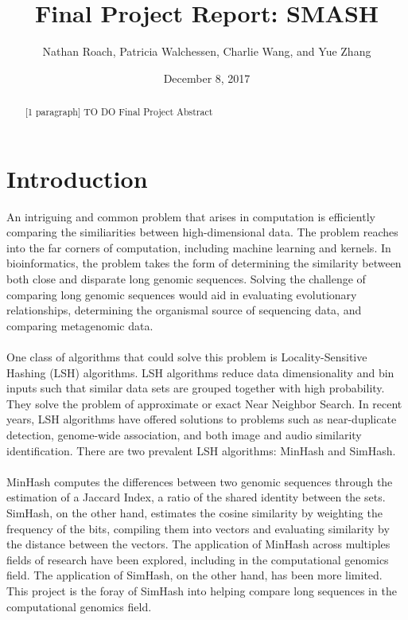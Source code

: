 \documentclass[12pt, letterpaper]{article}
\title{Final Project Report: SMASH}
\author{Nathan Roach, Patricia Walchessen, Charlie Wang, and Yue Zhang}
\date{December 8, 2017}
\begin{document}
\maketitle
\begin{abstract}
	[1 paragraph] \color{red} TO DO \color{black} Final Project Abstract
\end{abstract}

\section{Introduction}
An intriguing and common problem that arises in computation is efficiently comparing the similiarities between high-dimensional data. The problem reaches into the far corners of computation, including machine learning and kernels. In bioinformatics, the problem takes the form of determining the similarity between both close and disparate long genomic sequences. Solving the challenge of comparing long genomic sequences would aid in evaluating evolutionary relationships, determining the organismal source of sequencing data, and comparing metagenomic data. \\ \\
One class of algorithms that could solve this problem is Locality-Sensitive Hashing (LSH) algorithms. LSH algorithms reduce data dimensionality and bin inputs such that similar data sets are grouped together with high probability. They solve the problem of approximate or exact Near Neighbor Search. In recent years, LSH algorithms have offered solutions to problems such as near-duplicate detection, genome-wide association, and both image and audio similarity identification. There are two prevalent LSH algorithms: MinHash and SimHash. \\ \\
MinHash computes the differences between two genomic sequences through the estimation of a Jaccard Index, a ratio of the shared identity between the sets. SimHash, on the other hand, estimates the cosine similarity by weighting the frequency of the bits, compiling them into vectors and evaluating similarity by the distance between the vectors. The application of MinHash across multiples fields of research have been explored, including in the computational genomics field. The application of SimHash, on the other hand, has been more limited. This project is the foray of SimHash into helping compare long sequences in the computational genomics field.
\end{document}
